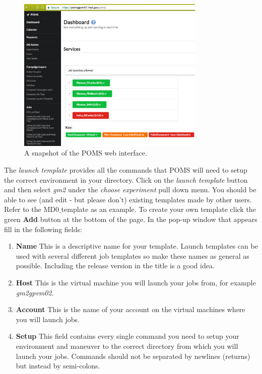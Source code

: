 \begin{figure}[htbp]
\centering
\includegraphics[width=0.8\textwidth]{pics/POMSSnapshot.pdf} 
\caption{A snapshot of the POMS web interface.}\label{fig:POMSSnapshot}
\end{figure}

\noindent The {\it{launch template}} provides all the commands that POMS will need to setup the correct environment in your directory. Click on the {\it{launch template} }button and then select {\it{gm2}} under the {\it{choose experiment}} pull down menu. You should be able to see (and edit - but please don't) existing templates made by other users.  Refer to the MD0$\_$template as an example. To create your own template click the green {\bf{Add}} button at the bottom of the page. In the pop-up window that appears fill in the following fields:

\begin{enumerate}
\item[]{\bf{Name}} This is a descriptive name for your template. Launch templates can be used with several different job templates so make these names as general as possible.  Including the release version in the title is a good idea.
\item[]{\bf{Host}} This is the virtual machine you will launch your jobs from, for example {\it gm2gpvm02}.
\item[]{\bf{Account}} This is the name of your account on the virtual machines  where you will launch jobs. 
\item[]{\bf{Setup}} This field contains every single command you need to setup your environment and maneuver to the correct directory from which you will launch your jobs. Commands should not be separated by newlines (returns) but instead by semi-colons.
\end{enumerate}

